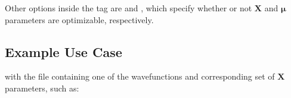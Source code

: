 \documentclass[letterpaper,10pt,english]{sphinxmanual}
\begin{document}
Other options inside the  tag are  and ,
which specify whether or not \(\mathbf{X}\) and \(\mathbf{\mu}\)
parameters are optimizable, respectively.


\subsection{Example Use Case}
\label{\detokenize{intro_wavefunction:id27}}
\begin{sphinxVerbatim}[commandchars=\\\{\}]
 
      
\end{sphinxVerbatim}

with the  file containing one of the wavefunctions and
corresponding set of \(\mathbf{X}\) parameters, such as:
\end{document}
